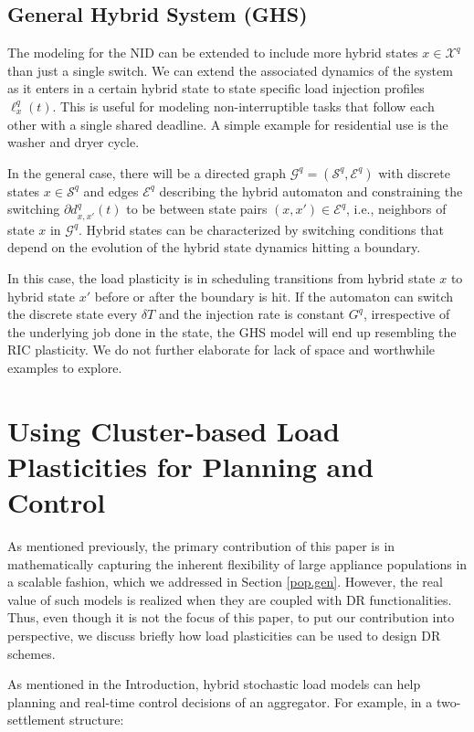 \documentclass[10pt]{IEEEtran}
\begin{document}
\subsection{General Hybrid System (GHS)}\label{cat5}
The modeling for the NID can be extended to include
more hybrid states $x\in {\mathcal X}^q$ than just a single switch. We can extend the associated dynamics  of the system as it enters in a certain hybrid state to state specific load injection profiles $\ell_x^q(t)$. This is useful for modeling non-interruptible tasks that follow each other with a single shared deadline. A simple example for residential use is the washer and dryer cycle. 

In the general case, there will be a directed graph ${\mathcal G}^q=({\mathcal S}^q,\mathcal{E}^q)$ with discrete states $x\in {\mathcal S}^q$ and edges $\mathcal{E}^q$ describing the hybrid automaton and constraining the switching $\partial d^q_{x,x'}(t)$ to be between state pairs $(x,x')\in \mathcal{E}^q$, i.e., neighbors of state $x$ in ${\mathcal G}^q$.  Hybrid states can be characterized by switching conditions that depend on the evolution of the hybrid state dynamics hitting a boundary.

In this case, the load plasticity is in scheduling  transitions from hybrid state $x$ to hybrid state $x'$ before or after the boundary is hit. If the automaton can switch the discrete state every $\delta T$ and the injection rate is constant $G^q$, irrespective of the underlying job done in the state, the GHS model will end up resembling the RIC plasticity. We do not further elaborate for lack of space and worthwhile examples to explore. 




\section{Using Cluster-based Load Plasticities for Planning and Control}\label{sec.why}

As mentioned previously, the primary contribution of this paper is in mathematically capturing the inherent flexibility of large appliance populations in a scalable fashion, which we addressed in Section \ref{pop.gen}.  However, the real value of such models is realized when they are coupled with DR functionalities. Thus, even though it is not the focus of this paper, to put our contribution into perspective, we discuss briefly how load plasticities can be used to design DR schemes.

As mentioned in the Introduction, hybrid stochastic load models can help planning and real-time control decisions of an aggregator. For example, in a  two-settlement structure:
\end{document}
